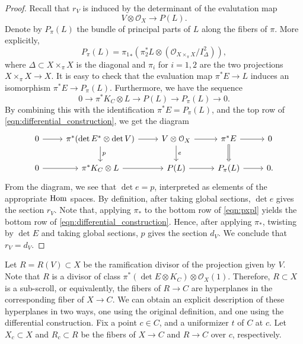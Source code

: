 \documentclass[11pt,reqno]{amsart}
\theoremstyle{plain}
\theoremstyle{definition}
\theoremstyle{remark}
\numberwithin{equation}{section}
\renewcommand{\to}{{\longrightarrow}}
\numberwithin{equation}{section}
\renewcommand{\O}{\mathcal O}
\begin{document}
\begin{proof}
  Recall that $r_V$ is induced by the determinant of the evalutation map
  \[ V \otimes \O_X \to P(L).\]
  Denote by $P_\pi(L)$ the bundle of principal parts of $L$ along the fibers of $\pi$.
  More explicitly,
  \[ P_\pi(L) = {\pi_1}_* \left(\pi_2^* L \otimes \left(\O_{X \times_\pi X} / I_{\Delta}^2\right)\right),\]
  where $\Delta \subset X \times_\pi X$ is the diagonal and $\pi_i$ for $i = 1,2$ are the two projections $X \times_\pi X \to X$.
  It is easy to check that the evaluation map $\pi^* E \to L$ induces an isomorphism $\pi^* E \to P_\pi(L)$.
  Furthermore, we have the sequence
  \[ 0 \to \pi^* K_C \otimes L \to P(L) \to P_\pi(L) \to 0.\]
  By combining this with the identification $\pi^* E = P_\pi(L)$, and the top row of \eqref{eqn:differential_construction}, we get the diagram
  \begin{equation}\label{eqn:pxpl}
    \begin{tikzcd}
      0 \arrow{r}& \pi^*(\det E^* \otimes \det V) \arrow{r}\arrow{d}{p}& V \otimes \O_X \arrow{r}\arrow{d}{e}& \pi^* E \arrow{r}\arrow{d}\arrow[equal]{d}& 0\\
      0 \arrow{r}& \pi^* K_C \otimes L \arrow{r}& P(L) \arrow{r}& P_\pi(L) \arrow{r}& 0.
    \end{tikzcd}
  \end{equation}
  From the diagram, we see that $\det e = p$, interpreted as elements of the appropriate $\operatorname{Hom}$ spaces.
  By definition, after taking global sections, $\det e$ gives the section $r_V$.
  Note that, applying $\pi_*$ to the bottom row of \eqref{eqn:pxpl} yields the bottom row of \eqref{eqn:differential_construction}.
  Hence, after applying $\pi_*$, twisting by $\det E$ and taking global sections, $p$ gives the section $d_V$.
  We conclude that $r_V = d_V$.
\end{proof}

Let $R = R(V) \subset X$ be the ramification divisor of the projection given by $V$.
Note that $R$ is a divisor of class $\pi^*(\det E \otimes K_C) \otimes \O_X(1)$.
Therefore, $R \subset X$ is a sub-scroll, or equivalently, the fibers of $R \to C$ are hyperplanes in the corresponding fiber of $X \to C$.
We can obtain an explicit description of these hyperplanes in two ways, one using the original definition, and one using the differential construction.
Fix a point $c \in C$, and a uniformizer $t$ of $C$ at $c$.
Let $X_c \subset X$ and $R_c \subset R$ be the fibers of $X \to C$ and $R \to C$ over $c$, respectively.
\end{document}
